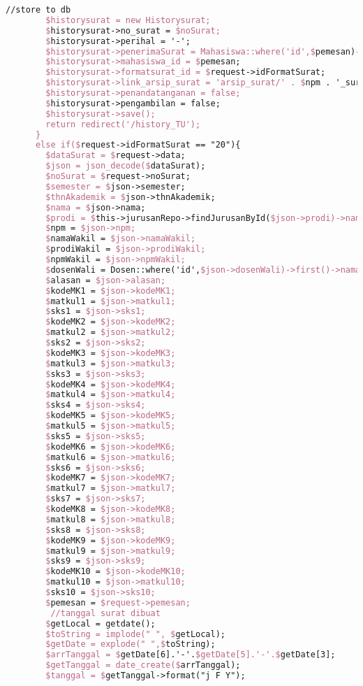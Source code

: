\begin{lstlisting}[language=tex,basicstyle=\tiny,caption=HistorysuratController.php]
        //store to db
        $historysurat = new Historysurat;
        $historysurat->no_surat = $noSurat;
        $historysurat->perihal = '-';
        $historysurat->penerimaSurat = Mahasiswa::where('id',$pemesan)->first()->dosen->nama_dosen;
        $historysurat->mahasiswa_id = $pemesan;
        $historysurat->formatsurat_id = $request->idFormatSurat;
        $historysurat->link_arsip_surat = 'arsip_surat/' . $npm . '_surat_perwakilan_perwalian_9mk.pdf';
        $historysurat->penandatanganan = false;
        $historysurat->pengambilan = false;
        $historysurat->save();
        return redirect('/history_TU');
      }
      else if($request->idFormatSurat == "20"){
        $dataSurat = $request->data;
        $json = json_decode($dataSurat);
        $noSurat = $request->noSurat;
        $semester = $json->semester;
        $thnAkademik = $json->thnAkademik;
        $nama = $json->nama;
        $prodi = $this->jurusanRepo->findJurusanById($json->prodi)->nama_jurusan;
        $npm = $json->npm;
        $namaWakil = $json->namaWakil;
        $prodiWakil = $json->prodiWakil;
        $npmWakil = $json->npmWakil;
        $dosenWali = Dosen::where('id',$json->dosenWali)->first()->nama_dosen;
        $alasan = $json->alasan;
        $kodeMK1 = $json->kodeMK1;
        $matkul1 = $json->matkul1;
        $sks1 = $json->sks1;
        $kodeMK2 = $json->kodeMK2;
        $matkul2 = $json->matkul2;
        $sks2 = $json->sks2;
        $kodeMK3 = $json->kodeMK3;
        $matkul3 = $json->matkul3;
        $sks3 = $json->sks3;
        $kodeMK4 = $json->kodeMK4;
        $matkul4 = $json->matkul4;
        $sks4 = $json->sks4;
        $kodeMK5 = $json->kodeMK5;
        $matkul5 = $json->matkul5;
        $sks5 = $json->sks5;
        $kodeMK6 = $json->kodeMK6;
        $matkul6 = $json->matkul6;
        $sks6 = $json->sks6;
        $kodeMK7 = $json->kodeMK7;
        $matkul7 = $json->matkul7;
        $sks7 = $json->sks7;
        $kodeMK8 = $json->kodeMK8;
        $matkul8 = $json->matkul8;
        $sks8 = $json->sks8;
        $kodeMK9 = $json->kodeMK9;
        $matkul9 = $json->matkul9;
        $sks9 = $json->sks9;
        $kodeMK10 = $json->kodeMK10;
        $matkul10 = $json->matkul10;
        $sks10 = $json->sks10;
        $pemesan = $request->pemesan;
         //tanggal surat dibuat
        $getLocal = getdate();
        $toString = implode(" ", $getLocal);
        $getDate = explode(" ",$toString);
        $arrTanggal = $getDate[6].'-'.$getDate[5].'-'.$getDate[3];
        $getTanggal = date_create($arrTanggal);
        $tanggal = $getTanggal->format("j F Y");


\end{lstlisting}
